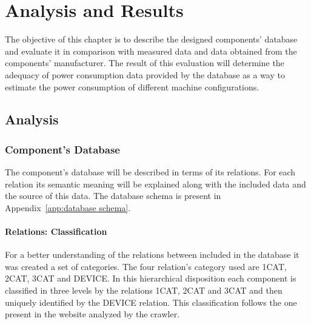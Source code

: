 

\chapter{Analysis and Results} \label{chap4:analysis_results}
%
    The objective of this chapter is to describe the designed components' database and evaluate it in comparison with measured data and data obtained from the components' manufacturer. The result of this evaluation will determine the adequacy of power consumption data provided by the database as a way to estimate the power consumption of different machine configurations.
    
\section{Analysis} \label{sec4:analysis}
\subsection{Component's Database} \label{sec4:component_database}
    The component's database will be described in terms of its relations. For each relation its semantic meaning will be explained along with the included data and the source of this data. The database schema is present in Appendix~\ref{app:database schema}.

    \subsubsection*{Relations: Classification}
        For a better understanding of the relations between included in the database it was created a set of categories. The four relation's category used are 1CAT, 2CAT, 3CAT and DEVICE. In this hierarchical disposition each component is classified in three levels by the relations 1CAT, 2CAT and 3CAT and then uniquely identified by the DEVICE relation. This classification follows the one present in the website analyzed by the crawler.

